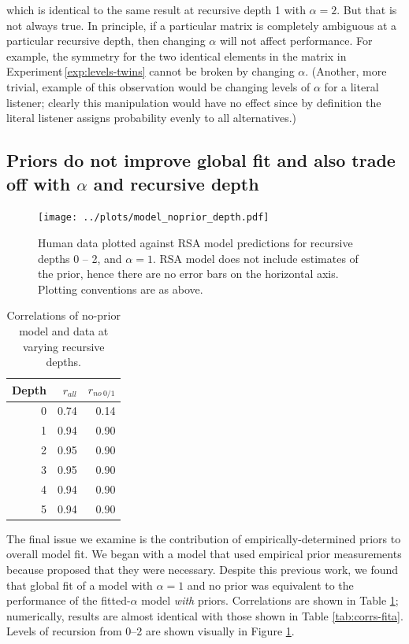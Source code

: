\documentclass[man,noapacite]{apa2}
\newcounter{Experiment}
\newcommand{\exptref}[1]{Experiment\,\ref{#1}}
\begin{document}
\noindent which is identical to the same result at recursive depth 1 with $\alpha = 2$. But that is not always true. In principle, if a particular matrix is completely ambiguous at a particular recursive depth, then changing $\alpha$ will not affect performance. For example, the symmetry for the two identical elements in the matrix in \exptref{exp:levels-twins} cannot be broken by changing $\alpha$. (Another, more trivial, example of this observation would be changing levels of $\alpha$ for a literal listener; clearly this manipulation would have no effect since by definition the literal listener assigns probability evenly to all alternatives.)

\subsection{Priors do not improve global fit and also trade off with $\alpha$ and recursive depth}

\begin{figure}[t]
 \centering
 \texttt{[image: ../plots/model\_noprior\_depth.pdf]}
 \caption{\label{fig:noprior} Human data plotted against RSA model predictions for recursive depths 0 -- 2, and $\alpha=1$. RSA model does not include estimates of the prior, hence there are no error bars on the horizontal axis. Plotting conventions are as above.}
\end{figure}

\begin{table}[ht]
\centering
\begin{tabular}{rrr}
  \hline
  Depth & $r_{all}$ & $r_{no~0/1}$ \\
  \hline
  0 & 0.74 & 0.14 \\
    1 & 0.94 & 0.90 \\
    2 & 0.95 & 0.90 \\
    3 & 0.95 & 0.90 \\
    4 & 0.94 & 0.90 \\
    5 & 0.94 & 0.90 \\
   \hline
\end{tabular}
\caption{\label{tab:corrs-noprior} Correlations of no-prior model and data at varying recursive depths.}
\end{table}

The final issue we examine is the contribution of empirically-determined priors to overall model fit. We began with a model that used empirical prior measurements because  proposed that they were necessary. Despite this previous work, we found that global fit of a model with $\alpha=1$ and no prior was equivalent to the performance of the fitted-$\alpha$ model \emph{with} priors. Correlations are shown in Table \ref{tab:corrs-noprior}; numerically, results are almost identical with those shown in Table \ref{tab:corrs-fita}. Levels of recursion from 0--2 are shown visually in Figure \ref{fig:noprior}.
\end{document}
